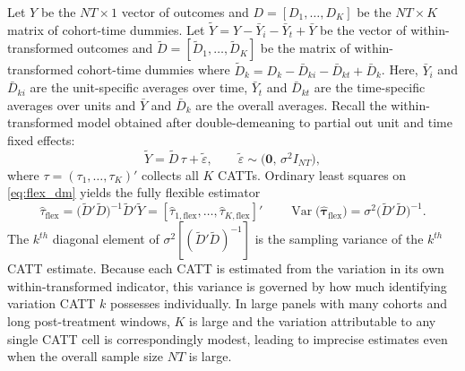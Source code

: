 \documentclass[margin=5in, 12pt]{article}
\DeclareMathOperator{\Var}{Var}
\newcommand{\1}{\mathbbm{1}}
\newcommand{\Dtd}{\tilde{D}}
\begin{document}
Let $Y$ be the $NT \times 1$ vector of outcomes and $D = [D_1, \ldots, D_K]$ be the $NT \times K$ matrix of cohort-time dummies. Let $\tilde{Y} = Y - \bar{Y}_i - \bar{Y}_t + \bar{Y}$ be the vector of within-transformed outcomes and $\tilde{D} = [\tilde{D}_1, \ldots, \tilde{D}_K]$ be the matrix of within-transformed cohort-time dummies where $\tilde{D}_k = D_k - \bar{D}_{ki} - \bar{D}_{kt} + \bar{D}_k$. Here, $\bar Y_i$ and $\bar D_{ki}$ are the unit-specific averages over time, $\bar Y_t$ and $\bar D_{kt}$ are the time-specific averages over units and $\bar Y$ and $\bar D_k$ are the overall averages. Recall the within-transformed model obtained after double-demeaning to
partial out unit and time fixed effects:
\begin{equation}
  \tilde{Y} = \Dtd\,\tau + \tilde{\varepsilon},
  \qquad
  \tilde{\varepsilon} \sim \bigl(\mathbf{0},\,\sigma^2 I_{NT}\bigr),
  \label{eq:flex_dm}
\end{equation}
where $\tau =
(\tau_1,\ldots,\tau_K)'$ collects all $K$ CATTs.
Ordinary least squares on \eqref{eq:flex_dm} yields the fully
flexible estimator
\begin{equation}
  \hat{\tau}_{\text{flex}}
  = \bigl(\Dtd'\Dtd\bigr)^{-1}\Dtd'\tilde{Y} = [\hat{\tau}_{1,\text{flex}},\dotsc,\hat{\tau}_{K,\text{flex}}]' \qquad
  \Var\bigl(\hat{\bm{\tau}}_{\text{flex}}\bigr)
  = \sigma^2\bigl(\Dtd'\Dtd\bigr)^{-1}.
  \label{eq:flex_var}
\end{equation}
The $k^{th}$ diagonal element of $\sigma^2[(\Dtd'\Dtd)^{-1}]$ is the sampling variance of the $k^{th}$ CATT estimate. Because each CATT is estimated from the variation in its own
within-transformed indicator, this variance is governed
by how much identifying variation CATT $k$ possesses individually.
In large panels with many cohorts and long post-treatment windows, $K$
is large and the variation attributable to any single CATT cell is
correspondingly modest, leading to imprecise estimates even when the
overall sample size $NT$ is large.
\end{document}
